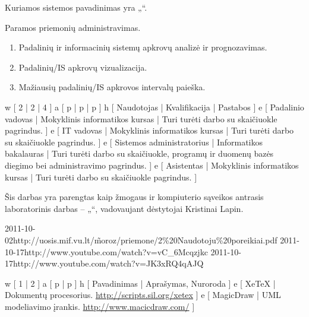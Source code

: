 Kuriamos sistemos pavadinimas yra „\systemname“.

Paramos priemonių administravimas.

\begin{enumerate}
  \item Padalinių ir informacinių sistemų apkrovų analizė ir prognozavimas.
  \item Padalinių/IS apkrovų vizualizacija.
  \item Mažiausių padalinių/IS apkrovos intervalų paieška.
\end{enumerate}


\xtable
{
  w [ 2 | 2 | 4 ]
  a [ p | p | p ]
  h [ Naudotojas | Kvalifikacija | Pastabos ]
  e [ Padalinio vadovas | Mokyklinis informatikos kursas
  | Turi turėti darbo su skaičiuokle pagrindus.
  ]
  e [ IT vadovas | Mokyklinis informatikos kursas
  | Turi turėti darbo su skaičiuokle pagrindus.
  ]
  e [ Sistemos administratorius | Informatikos bakalauras
  | Turi turėti darbo su skaičiuokle, programų ir duomenų bazės diegimo
  bei administravimo pagrindus.
  ]
  e [ Asistentas | Mokyklinis informatikos kursas
  | Turi turėti darbo su skaičiuokle pagrindus.
  ]
}

Šis darbas yra parengtas kaip žmogaus ir kompiuterio sąveikos
antrasis laboratorinis darbas – „\docname“, vadovaujant
dėstytojai Kristinai Lapin.

\xdoclist
{
  {2011-10-02}{http://uosis.mif.vu.lt/\~moroz/priemone/2\%20Naudotoju\%20poreikiai.pdf}
  {2011-10-17}{http://www.youtube.com/watch?v=vC_6Mcqzjkc}
  {2011-10-17}{http://www.youtube.com/watch?v=JK3xRQ4qAJQ}
}

\xtableu
{
  w [ 1 | 2 ]
  a [ p | p ]
  h [ Pavadinimas | Aprašymas, Nuroroda ]
  e [ XeTeX | Dokumentų procesorius. \newline \url{http://scripts.sil.org/xetex} ]
  e [ MagicDraw | UML modeliavimo įrankis. \newline \url{http://www.macicdraw.com/} ]
}

